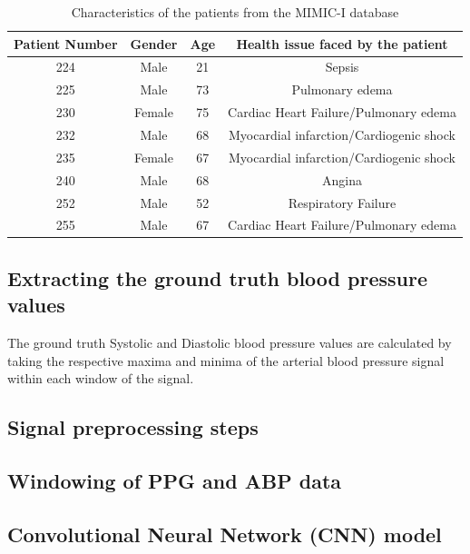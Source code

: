 \begin{itemize}
\begin{table}[H]
    \centering
    \begin{tabular}{|cccc|}
    \hline
    \textbf{Patient Number} & \textbf{Gender} & \textbf{Age} & \textbf{Health issue faced by the patient} \\ \hline
    224 & Male   & 21 & Sepsis                                  \\
    225 & Male   & 73 & Pulmonary edema                         \\
    230 & Female & 75 & Cardiac Heart Failure/Pulmonary edema   \\
    232 & Male   & 68 & Myocardial infarction/Cardiogenic shock \\
    235 & Female & 67 & Myocardial infarction/Cardiogenic shock \\
    240 & Male   & 68 & Angina                                  \\
    252 & Male   & 52 & Respiratory Failure                     \\
    255 & Male   & 67 & Cardiac Heart Failure/Pulmonary edema   \\ \hline
    \end{tabular}
    \caption{Characteristics of the patients from the MIMIC-I database}
    \label{tabPatients}
    \end{table}


\subsection{Extracting the ground truth blood pressure values}
The ground truth Systolic and Diastolic blood pressure values are calculated by taking the respective 
maxima and minima of the arterial blood pressure signal within each window of the signal.




\subsection{Signal preprocessing steps}


\subsection{Windowing of PPG and ABP data}

\subsection{Convolutional Neural Network (CNN) model}


\end{itemize}
